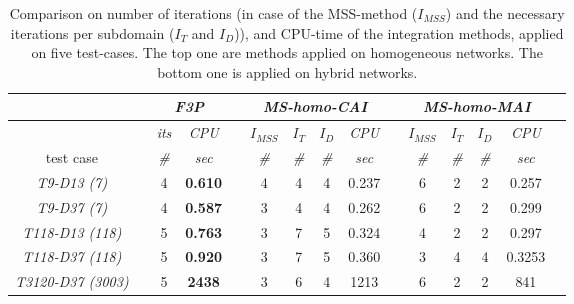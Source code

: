 \begin{table}[h]
\renewcommand{\arraystretch}{1.3}
\centering
\caption{Comparison on number of iterations (in case of the MSS-method ($I_{MSS}$) and the necessary iterations per subdomain ($I_T$ and $I_D$)), and CPU-time of the integration methods, applied on five test-cases. The top one are methods applied on homogeneous networks. The bottom one is applied on hybrid networks. }\label{tab:speed}
\begin{adjustbox}{width=1\textwidth} %
\small
\begin{tabular}{@{}l c cc c  cccc c cccc c  @{}}\toprule
                               && \multicolumn{2}{c}{\textit{F3P}} &&     \multicolumn{4}{c}{\textit{MS-homo-CAI}} && \multicolumn{4}{c}{\textit{MS-homo-MAI}} \\ \midrule 
\multicolumn{1}{l}{}        && \textit{its}      & \textit{CPU} && $I_{MSS}$      & $I_T$   &  $I_D$      & \textit{CPU}     &&$I_{MSS}$      & $I_T$   &  $I_D$      & \textit{CPU}      \\
\cmidrule{3-4}  \cmidrule{6-9}  \cmidrule{11-14}   
\multicolumn{1}{c}{test case}      && \textit{\#}       & \textit{sec} && \textit{\#}      & \textit{\#}    & \textit{\#}       & \textit{sec}     && \textit{\#}        & \textit{\#}     &  \textit{\#}       & \textit{sec}  \\
\midrule
\multicolumn{1}{c}{\textit{T9-D13 (7)}}         && 4 &\textbf{ 0.610}    && 4 & 4 & 4 &  0.237 && 6 & 2 & 2  & {0.257}\\
\multicolumn{1}{c}{\textit{T9-D37 (7)}}         && 4 & \textbf{0.587}    && 3 & 4 & 4 &  0.262 && 6 & 2 & 2  & {0.299}\\
\multicolumn{1}{c}{{\textit{T118-D13 (118)}}}   && 5 & \textbf{0.763}    && 3 & 7 & 5  & 0.324 && 4 & 2 & 2 &  0.297  \\
\multicolumn{1}{c}{{\textit{T118-D37 (118)}}}   && 5 & \textbf{0.920}    && 3 & 7 & 5  & 0.360 && 3 & 4 & 4 &  0.3253\\
\multicolumn{1}{c}{{\textit{T3120-D37 (3003)}}} && 5 & \textbf{2438}     && 3 & 6 & 4  & 1213  && 6 & 2 & 2 &  841    \\

\end{tabular}
\end{adjustbox}
\end{table}
